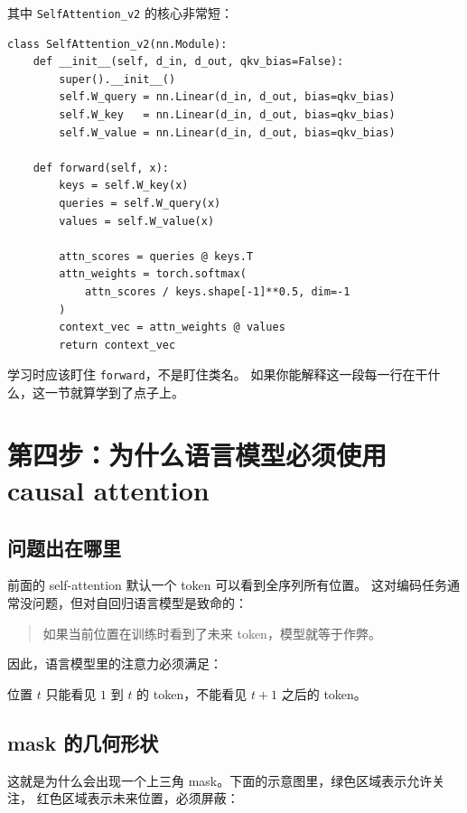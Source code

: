 \documentclass[12pt,a4paper]{ctexart}
\newcommand{\code}[1]{\texttt{#1}}
\begin{document}
其中 \code{SelfAttention\_v2} 的核心非常短：

\begin{lstlisting}[style=py]
class SelfAttention_v2(nn.Module):
    def __init__(self, d_in, d_out, qkv_bias=False):
        super().__init__()
        self.W_query = nn.Linear(d_in, d_out, bias=qkv_bias)
        self.W_key   = nn.Linear(d_in, d_out, bias=qkv_bias)
        self.W_value = nn.Linear(d_in, d_out, bias=qkv_bias)

    def forward(self, x):
        keys = self.W_key(x)
        queries = self.W_query(x)
        values = self.W_value(x)

        attn_scores = queries @ keys.T
        attn_weights = torch.softmax(
            attn_scores / keys.shape[-1]**0.5, dim=-1
        )
        context_vec = attn_weights @ values
        return context_vec
\end{lstlisting}

学习时应该盯住 \code{forward}，不是盯住类名。
如果你能解释这一段每一行在干什么，这一节就算学到了点子上。

\section{第四步：为什么语言模型必须使用 causal attention}

\subsection{问题出在哪里}

前面的 self-attention 默认一个 token 可以看到全序列所有位置。
这对编码任务通常没问题，但对自回归语言模型是致命的：

\begin{quote}
如果当前位置在训练时看到了未来 token，模型就等于作弊。
\end{quote}

因此，语言模型里的注意力必须满足：

\begin{center}
位置 \(t\) 只能看见 \(1\) 到 \(t\) 的 token，不能看见 \(t+1\) 之后的 token。
\end{center}

\subsection{mask 的几何形状}

这就是为什么会出现一个上三角 mask。下面的示意图里，绿色区域表示允许关注，
红色区域表示未来位置，必须屏蔽：
\end{document}
